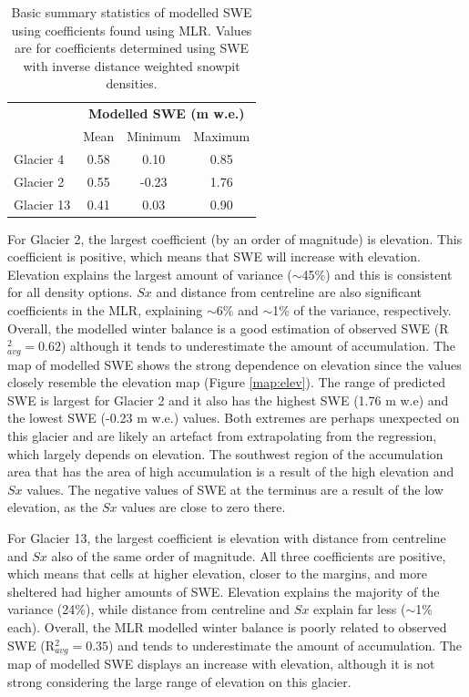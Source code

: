 \documentclass[12pt]{article}
\begin{document}
\begin{table}
\centering
\caption{Basic summary statistics of modelled SWE using coefficients found using MLR. Values are for coefficients determined using SWE with inverse distance weighted snowpit densities. }
\label{tab:MLRsweMinMax}
\begin{tabular}{lccc}
\multicolumn{1}{l}{} & \multicolumn{3}{c}{\textbf{Modelled SWE (m w.e.)}} \\
                     & Mean          & Minimum          & Maximum         \\ \hline
Glacier 4            & 0.58          & 0.10             & 0.85            \\
Glacier 2            & 0.55          & -0.23            & 1.76            \\
Glacier 13           & 0.41          & 0.03             & 0.90           
\end{tabular}
\end{table} 

For Glacier 2, the largest coefficient (by an order of magnitude) is elevation. This coefficient is positive, which means that SWE will increase with elevation. Elevation explains the largest amount of variance ($\sim$45\%) and this is consistent for all density options. $Sx$ and distance from centreline are also significant coefficients in the MLR, explaining $\sim$6\% and $\sim$1\% of the variance, respectively.  Overall, the modelled winter balance is a good estimation of observed SWE (R$^2_{avg}=0.62$) although it tends to underestimate the amount of accumulation. The map of modelled SWE shows the strong dependence on elevation since the values closely resemble the elevation map (Figure \ref{map:elev}). The range of predicted SWE is largest for Glacier 2 and it also has the highest SWE (1.76 m w.e) and the lowest SWE (-0.23 m w.e.) values. Both extremes are perhaps unexpected on this glacier and are likely an artefact from extrapolating from the regression, which largely depends on elevation. The southwest region of the accumulation area that has the area of high accumulation is a result of the high elevation and $Sx$ values. The negative values of SWE at the terminus are a result of the low elevation, as the $Sx$ values are close to zero there. 

For Glacier 13, the largest coefficient is elevation with distance from centreline and $Sx$ also of the same order of magnitude. All three coefficients are positive, which means that cells at higher elevation, closer to the margins, and more sheltered had higher amounts of SWE. Elevation explains the majority of the variance (24\%), while distance from centreline and $Sx$ explain far less ($\sim$1\% each).  Overall, the MLR modelled winter balance is poorly related to observed SWE (R$^2_{avg}=0.35$) and tends to underestimate the amount of accumulation. The map of modelled SWE displays an increase with elevation, although it is not strong considering the large range of elevation on this glacier.
\end{document}
